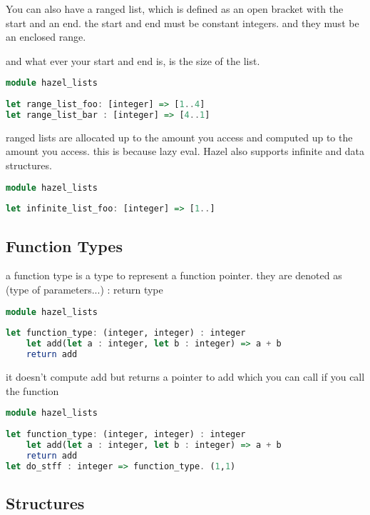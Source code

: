 \documentclass{article}
\begin{document}
You can also have a ranged list, which is defined as an open bracket with the start and an end. the start and end must be constant integers. and they must be an enclosed range. 

and what ever your start and end is, is the size of the list.

\begin{lstlisting}[language=Haskell]
module hazel_lists
        
let range_list_foo: [integer] => [1..4] 
let range_list_bar : [integer] => [4..1] 
\end{lstlisting}

ranged lists are allocated up to the amount you access and computed up to the amount you access. this is because lazy eval.  
Hazel also supports infinite and data structures. 

\begin{lstlisting}[language=Haskell, caption=Infinite List]
module hazel_lists
        
let infinite_list_foo: [integer] => [1..] 
\end{lstlisting}



\subsection{Function Types}
a function type is a type to represent a function pointer.
they are denoted as (type of parameters...) : return type 

\begin{lstlisting}[language=Haskell, caption=A function that returns a function]
module hazel_lists
        
let function_type: (integer, integer) : integer
    let add(let a : integer, let b : integer) => a + b
    return add 
\end{lstlisting}

it doesn't compute add but returns a pointer to add which you can call if you call the function 

\begin{lstlisting}[language=Haskell, caption=A function that returns a function]
module hazel_lists
        
let function_type: (integer, integer) : integer
    let add(let a : integer, let b : integer) => a + b
    return add 
let do_stff : integer => function_type. (1,1)
\end{lstlisting}


\subsection{Structures}
\end{document}
